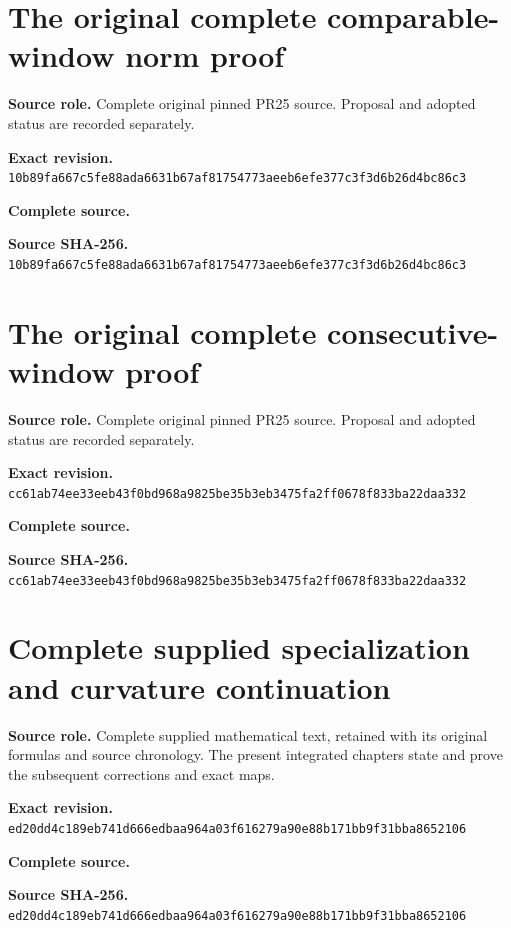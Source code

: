 \begingroup
\sloppy
\small
\clearpage
\section{The original complete comparable-window norm proof}
\noindent\textbf{Source role.} Complete original pinned PR25 source. Proposal and adopted status are recorded separately.\par
\noindent\textbf{Exact revision.} \nolinkurl{10b89fa667c5fe88ada6631b67af81754773aeeb6efe377c3f3d6b26d4bc86c3}\par
\noindent\textbf{Complete source.} \par
\noindent\textbf{Source SHA-256.} \nolinkurl{10b89fa667c5fe88ada6631b67af81754773aeeb6efe377c3f3d6b26d4bc86c3}\par\medskip

\endgroup

\begingroup
\sloppy
\small
\clearpage
\section{The original complete consecutive-window proof}
\noindent\textbf{Source role.} Complete original pinned PR25 source. Proposal and adopted status are recorded separately.\par
\noindent\textbf{Exact revision.} \nolinkurl{cc61ab74ee33eeb43f0bd968a9825be35b3eb3475fa2ff0678f833ba22daa332}\par
\noindent\textbf{Complete source.} \par
\noindent\textbf{Source SHA-256.} \nolinkurl{cc61ab74ee33eeb43f0bd968a9825be35b3eb3475fa2ff0678f833ba22daa332}\par\medskip

\endgroup

\begingroup
\sloppy
\small
\clearpage
\section{Complete supplied specialization and curvature continuation}
\noindent\textbf{Source role.} Complete supplied mathematical text, retained with its original formulas and source chronology. The present integrated chapters state and prove the subsequent corrections and exact maps.\par
\noindent\textbf{Exact revision.} \nolinkurl{ed20dd4c189eb741d666edbaa964a03f616279a90e88b171bb9f31bba8652106}\par
\noindent\textbf{Complete source.} \par
\noindent\textbf{Source SHA-256.} \nolinkurl{ed20dd4c189eb741d666edbaa964a03f616279a90e88b171bb9f31bba8652106}\par\medskip

\endgroup

